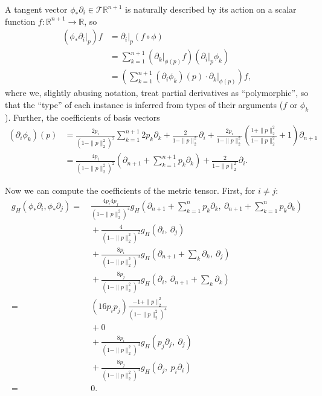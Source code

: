 A tangent vector \( \phi_*\partial_i \in \mathcal{T}\mathbb{R}^{n+1} \) is
naturally described by its action on a scalar function \(
f:\mathbb{R}^{n+1}\to\mathbb{R} \), so
\begin{align*}
(\phi_* \left.\partial_i\right|_p)f &= \left.\partial_i\right|_p(f\circ \phi)\\
&= \sum_{k=1}^{n+1} (\left.\partial_k\right|_{\phi(p)} f) (\left.\partial_i\right|_p \phi_k)\\
&= \left(\sum_{k=1}^{n+1} (\partial_i \phi_k)(p) \cdot
\left.\partial_k\right|_{\phi(p)}\right) f,
\end{align*}
where we, slightly abusing notation, treat partial derivatives as
``polymorphic'', so that the ``type'' of each instance is inferred from types
of their arguments (\( f \) or \( \phi_k \)).
Further, the coefficients of basis vectors
\begin{align*}
(\partial_i\phi_k)(p)
&= \frac{2p_i}{(1-\|p\|_2^2)^2} \sum_{k=1}^{n+1} 2p_k \partial_k
+ \frac{2}{1 - \|p\|_2^2} \partial_i
+ \frac{2p_i}{1 - \|p\|_2^2} \left( \frac{1+\|p\|_2^2}{1-\|p\|_2^2} + 1\right) \partial_{n+1}\\
&= \frac{4p_i}{(1-\|p\|_2^2)^2} (\partial_{n+1} + \sum_{k=1}^{n+1} p_k \partial_k)
+ \frac{2}{1-\|p\|_2^2}\partial_i.
\end{align*}

Now we can compute the coefficients of the metric tensor.
First, for \( i\neq j \):
\begin{align*}
g_H(\phi_*\partial_i, \phi_*\partial_j)
= &~\frac{4p_i 4p_j}{(1 - \|p\|_2^2)^4}
     g_H(\partial_{n+1} + \sum_{k=1}^n p_k \partial_k,~
         \partial_{n+1} + \sum_{k=1}^n p_k \partial_k) \\
  &~+ \frac{4}{(1-\|p\|_2^2)^2} g_H(\partial_i,~\partial_j) \\
  &~+ \frac{8p_i}{(1 - \|p\|_2^2)^3} g_H(\partial_{n+1} + \sum_{k}\partial_k,~\partial_j) \\
  &~+ \frac{8p_j}{(1 - \|p\|_2^2)^3} g_H(\partial_i,~\partial_{n+1} + \sum_{k}\partial_k) \\
= &~(16p_ip_j)\frac{-1 + \|p\|_2^2}{(1 - \|p\|_2^2)^4} \\
  &~+ 0 \\
  &~+ \frac{8p_i}{(1 - \|p\|_2^2)^3} g_H(p_j \partial_j,~\partial_j) \\
  &~+ \frac{8p_j}{(1 - \|p\|_2^2)^3} g_H(\partial_j,~p_i \partial_i) \\
= &~0.
\end{align*}

